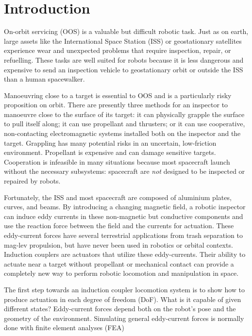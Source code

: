 \documentclass[letterpaper, 10 pt, conference]{ieeeconf}  %
\begin{document}
\section{Introduction}
On-orbit servicing (OOS)\label{def:OOS} is a valuable but difficult robotic task\cite{Coleshill2009}\cite{Ellery2004}\cite{Ellery2008}. Just as on earth, large assets like the International Space Station (ISS) \label{def:ISS} or geostationary satellites experience wear and unexpected problems that require inspection, repair, or refuelling\cite{Moosavian2007}\cite{Saleh2002}. These tasks are well suited for robots because it is less dangerous and expensive to send an inspection vehicle to geostationary orbit or outside the ISS than a human spacewalker\cite{Ambrose2012}. 
%
\par Manoeuvring close to a target is essential to OOS and is a particularly risky proposition on orbit. There are presently three methods for an inspector to manoeuvre close to the surface of its target: it can physically grapple the surface to pull itself along; it can use propellant and thrusters; or it can use cooperative, non-contacting electromagnetic systems installed both on the inspector and the target. Grappling has many potential risks in an uncertain, low-friction environment\cite{Nguyen-Huynh2011}. Propellant is expensive and can damage sensitive targets\cite{Markelov2012}. Cooperation is infeasible in many situations because most spacecraft launch without the necessary subsystems: spacecraft are \textit{not} designed to be inspected or repaired by robots.
%
\par Fortunately, the ISS and most spacecraft are composed of aluminium plates, curves, and beams. By introducing a changing magnetic field, a robotic inspector can induce eddy currents in these non-magnetic but conductive components and use the reaction force between the field and the currents for actuation\cite{Smyth1989}. These eddy-current forces have several terrestrial applications from trash separation \cite{Rem1997} to mag-lev propulsion,\cite{Paudel2012a}\cite{Ohji2007} but have never been used in robotics or orbital contexts. Induction couplers are actuators that utilize these eddy-currents. Their ability to actuate near a target without propellant or mechanical contact can provide a completely new way to perform robotic locomotion and manipulation in space.    
%
\par The first step towards an induction coupler locomotion system is to show how to produce actuation in each degree of freedom (DoF)\label{def:dof}. What is it capable of given different states? Eddy-current forces depend both on the robot's pose and the geometry of the environment. Simulating general eddy-current forces is normally done with finite element analyses (FEA)\label{def:fea} 
\end{document}
